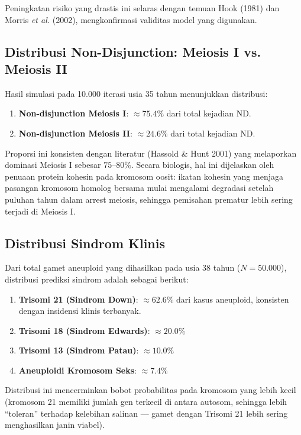\documentclass[10pt,a4paper,twocolumn]{article}
\begin{document}
Peningkatan risiko yang drastis ini selaras dengan temuan Hook (1981) dan
Morris \textit{et al.} (2002), mengkonfirmasi validitas model yang digunakan.

\subsection{Distribusi Non-Disjunction: Meiosis I vs. Meiosis II}

Hasil simulasi pada 10.000 iterasi usia 35 tahun menunjukkan distribusi:

\begin{enumerate}[leftmargin=*,noitemsep,topsep=2pt]
    \item \textbf{Non-disjunction Meiosis I}: $\approx 75.4\%$ dari total kejadian ND.
    \item \textbf{Non-disjunction Meiosis II}: $\approx 24.6\%$ dari total kejadian ND.
\end{enumerate}

Proporsi ini konsisten dengan literatur (Hassold \& Hunt 2001) yang melaporkan
dominasi Meiosis I sebesar $75$--$80\%$. Secara biologis, hal ini dijelaskan oleh
penuaan protein kohesin pada kromosom oosit: ikatan kohesin yang menjaga pasangan
kromosom homolog bersama mulai mengalami degradasi setelah puluhan tahun dalam
arrest meiosis, sehingga pemisahan prematur lebih sering terjadi di Meiosis I.

\subsection{Distribusi Sindrom Klinis}

Dari total gamet aneuploid yang dihasilkan pada usia 38 tahun ($N=50.000$),
distribusi prediksi sindrom adalah sebagai berikut:

\begin{enumerate}[leftmargin=*,noitemsep,topsep=2pt]
    \item \textbf{Trisomi 21 (Sindrom Down)}: $\approx 62.6\%$ dari kasus aneuploid,
        konsisten dengan insidensi klinis terbanyak.
    \item \textbf{Trisomi 18 (Sindrom Edwards)}: $\approx 20.0\%$
    \item \textbf{Trisomi 13 (Sindrom Patau)}: $\approx 10.0\%$
    \item \textbf{Aneuploidi Kromosom Seks}: $\approx 7.4\%$
\end{enumerate}

Distribusi ini mencerminkan bobot probabilitas pada kromosom yang lebih kecil
(kromosom 21 memiliki jumlah gen terkecil di antara autosom, sehingga lebih
``toleran'' terhadap kelebihan salinan --- gamet dengan Trisomi 21 lebih sering
menghasilkan janin viabel).
\end{document}
